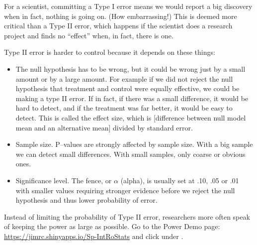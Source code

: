 For a scientist, committing a Type I error means we would report a
big discovery when in fact, nothing is going on. (How embarrassing!)
This is deemed more critical than a Type II error, which happens if
the scientist does a research project and finds no ``effect'' when, in
fact, there is one. 


Type II error is harder to control because it depends on these things:
\vspace{-.2cm}
\begin{itemize}
\item  The null hypothesis has to be wrong, but it could be wrong just
  by a small amount or by a large amount.  For example if 
   we did not reject the null hypothesis that treatment and
  control  were equally effective,  we could be making a type II
  error.  If in fact, if there was a small difference, it would be
  hard to detect, and if the treatment was far better, it would
  be easy to detect.  This is called the effect size, which is
  [difference between null model mean and an alternative mean] divided
  by standard error.
\item  Sample size.  P--values are strongly affected by sample
  size. With a big sample we can detect small differences.  With small
  samples, only coarse or obvious ones.
\item  Significance level.  The fence, or $\alpha$ (alpha), is
  usually set at .10, .05 or .01 with smaller values requiring
  stronger evidence before we reject the null hypothesis and thus
  lower probability of error.  
\end{itemize}


Instead of limiting the probability of Type II error, researchers more
often speak of keeping the power as large as possible.   Go to the
Power Demo page: 
\url{https://jimrc.shinyapps.io/Sp-IntRoStats} and click
 under .
\begin{students}
\vspace{.5cm}
\end{students}


